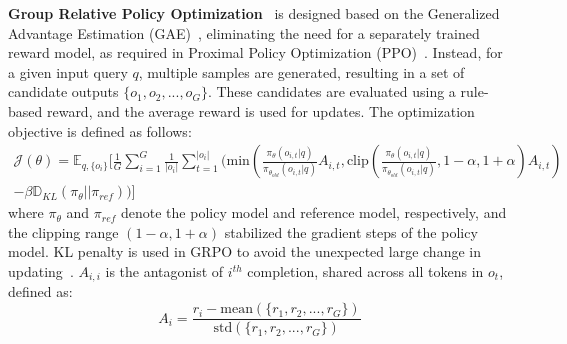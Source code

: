 \textbf{Group Relative Policy Optimization}~\citep{grpo} is designed based on the Generalized Advantage Estimation (GAE)~\citep{schulman2015high}, eliminating the need for a separately trained reward model, as required in Proximal Policy Optimization (PPO)~\citep{engstrom2019implementation,schulman2017proximal}. Instead, for a given input query $q$, multiple samples are generated, resulting in a set of candidate outputs $\{o_1, o_2, ..., o_G\}$. These candidates are evaluated using a rule-based reward, and the average reward is used for updates. The optimization objective is defined as follows:
\begin{align}\label{eq:grpo}
\mathcal{J}(\theta) = \mathbb{E}_{q,\{o_i\}} [ \frac{1}{G} \sum_{i=1}^{G} \frac{1}{|o_i|} \sum_{t=1}^{|o_i|}(\mathrm{min}(\frac{\pi_{\theta}(o_{i,t}|q)}{\pi_{\theta_{old}}(o_{i,t}|q)}A_{i,t}, \mathrm{clip}(\frac{\pi_{\theta}(o_{i,t}|q)}{\pi_{\theta_{old}}(o_{i,t}|q)}, 1-\alpha, 1+\alpha)A_{i,t}) \nonumber\\ - \beta\mathbb{D}_{KL}(\pi_\theta||\pi_{ref}))]
\end{align}
where $\pi_{\theta}$ and $\pi_{ref}$ denote the policy model and reference model, respectively, and the clipping range $(1-\alpha, 1+\alpha)$ stabilized the gradient steps of the policy model. KL penalty is used in GRPO to avoid the unexpected large change in updating~\citep{schulman2017proximal}. $A_{i,i}$ is the antagonist of $i^{th}$ completion, shared across all tokens in $o_t$, defined as:
\begin{equation}\label{eq:advantage}
A_i = \frac{r_i - \mathrm{mean}(\{r_1, r_2,...,r_G\})}{\mathrm{std}(\{r_1, r_2,...,r_G\})}
\end{equation}

